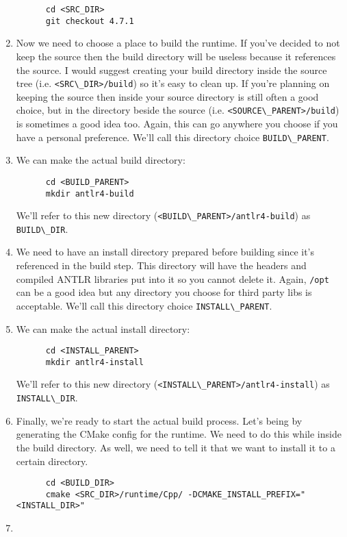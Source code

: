 \documentclass{article}
\begin{document}
\begin{enumerate}
\begin{lstlisting}
      cd <SRC_DIR>
      git checkout 4.7.1
    \end{lstlisting}
  \item
    Now we need to choose a place to build the runtime. If you've decided to not keep the source
    then the build directory will be useless because it references the source. I would suggest
    creating your build directory inside the source tree (i.e. \lstinline{<SRC\_DIR>/build}) so
    it's easy to clean up. If you're planning on keeping the source then inside your source
    directory is still often a good choice, but in the directory beside the source (i.e.
    \lstinline{<SOURCE\_PARENT>/build}) is sometimes a good idea too. Again, this can go anywhere
    you choose if you have a personal preference. We'll call this directory choice
    \lstinline{BUILD\_PARENT}.
  \item
    We can make the actual build directory:
    \begin{lstlisting}
      cd <BUILD_PARENT>
      mkdir antlr4-build
    \end{lstlisting}
    We'll refer to this new directory (\lstinline{<BUILD\_PARENT>/antlr4-build}) as
    \lstinline{BUILD\_DIR}.
  \item
    We need to have an install directory prepared before building since it's referenced in the
    build step. This directory will have the headers and compiled ANTLR libraries put into it so
    you cannot delete it. Again, \lstinline{/opt} can be a good idea but any directory you choose
    for third party libs is acceptable. We'll call this directory choice
    \lstinline{INSTALL\_PARENT}.
  \item
    We can make the actual install directory:
    \begin{lstlisting}
      cd <INSTALL_PARENT>
      mkdir antlr4-install
    \end{lstlisting}
    We'll refer to this new directory (\lstinline{<INSTALL\_PARENT>/antlr4-install}) as
    \lstinline{INSTALL\_DIR}.
  \item
    Finally, we're ready to start the actual build process. Let's being by generating the CMake
    config for the runtime. We need to do this while inside the build directory. As well, we need
    to tell it that we want to install it to a certain directory.
    \begin{lstlisting}
      cd <BUILD_DIR>
      cmake <SRC_DIR>/runtime/Cpp/ -DCMAKE_INSTALL_PREFIX="<INSTALL_DIR>"
    \end{lstlisting}
  \item

\end{enumerate}
\end{document}
